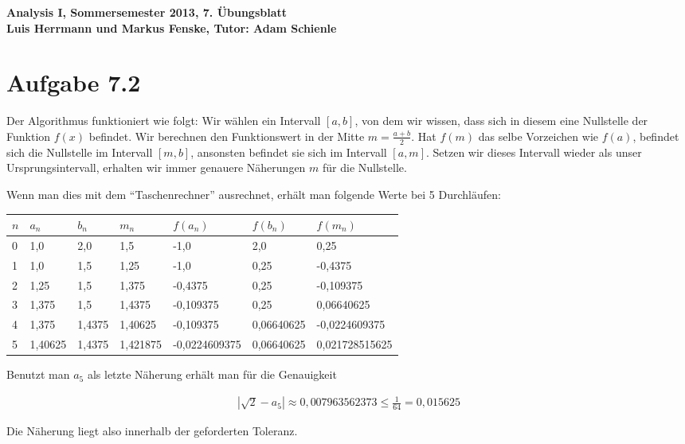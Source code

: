 \documentclass[a4paper,german,12pt,smallheadings]{scrartcl}
\begin{document}
\begin{center}
\bfseries %
\sffamily %
\vspace{-40pt}
Analysis I, Sommersemester 2013, 7. Übungsblatt \\
Luis Herrmann und Markus Fenske, Tutor: Adam Schienle
\vspace{-10pt}
\end{center}

\section{Aufgabe 7.2}

Der Algorithmus funktioniert wie folgt: Wir wählen ein Intervall $[a,b]$, von
dem wir wissen, dass sich in diesem eine Nullstelle der Funktion $f(x)$
befindet. Wir berechnen den Funktionswert in der Mitte $m = \frac{a+b}{2}$. Hat
$f(m)$ das selbe Vorzeichen wie $f(a)$, befindet sich die Nullstelle im
Intervall $[m, b]$, ansonsten befindet sie sich im Intervall $[a, m]$. Setzen
wir dieses Intervall wieder als unser Ursprungsintervall, erhalten wir immer
genauere Näherungen $m$ für die Nullstelle.

Wenn man dies mit dem ``Taschenrechner'' ausrechnet,
erhält man folgende Werte bei 5 Durchläufen:

\vspace{20pt}
\begin{tabular}{lllllll}
\hline
$n$ & $a_n$   & $b_n$ & $m_n$ & $f(a_n)$ & $f(b_n)$ & $f(m_n)$ \\ \hline
0 & 1{,}0 & 2{,}0 & 1{,}5 & -1{,}0 & 2{,}0 & 0{,}25 \\
1 & 1{,}0 & 1{,}5 & 1{,}25 & -1{,}0 & 0{,}25 & -0{,}4375 \\
2 & 1{,}25 & 1{,}5 & 1{,}375 & -0{,}4375 & 0{,}25 & -0{,}109375 \\
3 & 1{,}375 & 1{,}5 & 1{,}4375 & -0{,}109375 & 0{,}25 & 0{,}06640625 \\
4 & 1{,}375 & 1{,}4375 & 1{,}40625 & -0{,}109375 & 0{,}06640625 & -0{,}0224609375 \\
5 & 1{,}40625 & 1{,}4375 & 1{,}421875 & -0{,}0224609375 & 0{,}06640625 & 0{,}021728515625 \\
\hline
\end{tabular}
\vspace{20pt}

Benutzt man $a_5$ als letzte Näherung erhält man für die Genauigkeit

\begin{align*}
  |\sqrt{2} - a_5| \approx 0{,}007963562373 \le \frac{1}{64} = 0{,}015625
\end{align*}

Die Näherung liegt also innerhalb der geforderten Toleranz.
\end{document}

